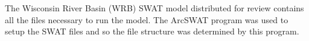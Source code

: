 The Wisconsin River Basin (WRB) SWAT model distributed for review contains all the files necessary to run the model. The ArcSWAT program was used to setup the SWAT files and so the file structure was determined by this program. 



